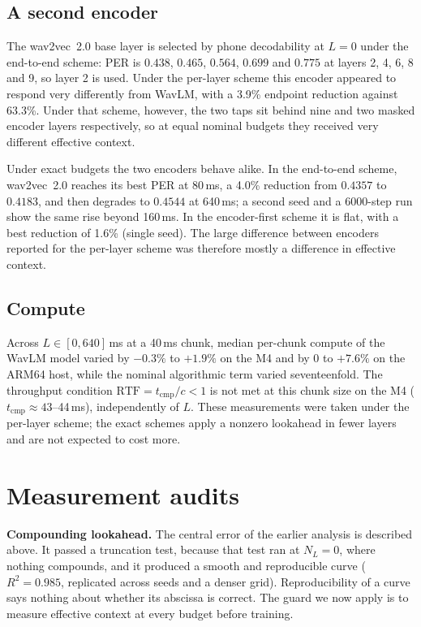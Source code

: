 \documentclass[preprint,12pt,authoryear]{elsarticle}
\newcommand{\tcmp}{\ensuremath{t_{\mathrm{cmp}}}}
\begin{document}
\subsection{A second encoder}
\label{sec:encoder}

The wav2vec~2.0 base layer is selected by phone decodability at $L=0$ under
the end-to-end scheme: PER is $0.438$, $0.465$, $0.564$, $0.699$ and $0.775$
at layers 2, 4, 6, 8 and 9, so layer 2 is used. Under the per-layer scheme
this encoder appeared to respond very differently from WavLM, with a 3.9\%
endpoint reduction against 63.3\%. Under that scheme, however, the two taps
sit behind nine and two masked encoder layers respectively, so at equal
nominal budgets they received very different effective context.

Under exact budgets the two encoders behave alike. In the end-to-end scheme,
wav2vec~2.0 reaches its best PER at 80\,ms, a 4.0\% reduction from $0.4357$ to
$0.4183$, and then degrades to $0.4544$ at 640\,ms; a second seed and a
6000-step run show the same rise beyond 160\,ms. In the encoder-first scheme
it is flat, with a best reduction of 1.6\% (single seed). The large
difference between encoders reported for the per-layer scheme was therefore
mostly a difference in effective context.

\subsection{Compute}
\label{sec:compute}

Across $L\in[0,640]$\,ms at a 40\,ms chunk, median per-chunk compute of the
WavLM model varied by $-0.3\%$ to $+1.9\%$ on the M4 and by 0 to $+7.6\%$ on
the ARM64 host, while the nominal algorithmic term varied seventeenfold. The
throughput condition $\mathrm{RTF}=\tcmp/c<1$ is not met at this chunk size
on the M4 ($\tcmp\approx43$--44\,ms), independently of $L$. These
measurements were taken under the per-layer scheme; the exact schemes apply a
nonzero lookahead in fewer layers and are not expected to cost more.

\section{Measurement audits}
\label{sec:lessons}

\textbf{Compounding lookahead.} The central error of the earlier analysis is
described above. It passed a truncation test, because that test ran at
$N_L=0$, where nothing compounds, and it produced a smooth and reproducible
curve ($R^2=0.985$, replicated across seeds and a denser grid).
Reproducibility of a curve says nothing about whether its abscissa is
correct. The guard we now apply is to measure effective context at every
budget before training.
\end{document}

